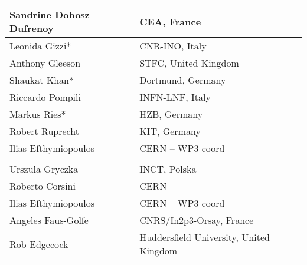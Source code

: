 \begin{longtable}{|L{0.48\textwidth}|C{0.48\textwidth}|}
    Sandrine Dobosz Dufrenoy	& CEA, France  \\ \hline
    Leonida Gizzi*  	& CNR-INO, Italy  \\ \hline
    Anthony Gleeson 	& STFC, United Kingdom  \\ \hline
    Shaukat Khan*	& Dortmund, Germany  \\ \hline
    Riccardo Pompili 	& INFN-LNF, Italy  \\ \hline
    Markus Ries* 	& HZB, Germany  \\ \hline
    Robert Ruprecht 	& KIT, Germany  \\ \hline
    Ilias Efthymiopoulos	& CERN – WP3 coord  \\ \hline
     \\ \hline
    Urszula Gryczka	& INCT, Polska  \\ \hline
    Roberto Corsini	& CERN  \\ \hline
    Ilias Efthymiopoulos	& CERN – WP3 coord  \\ \hline
    Angeles Faus-Golfe	& CNRS/In2p3-Orsay, France  \\ \hline
    Rob Edgecock	& Huddersfield University, United Kingdom  \\ \hline
\end{longtable}


